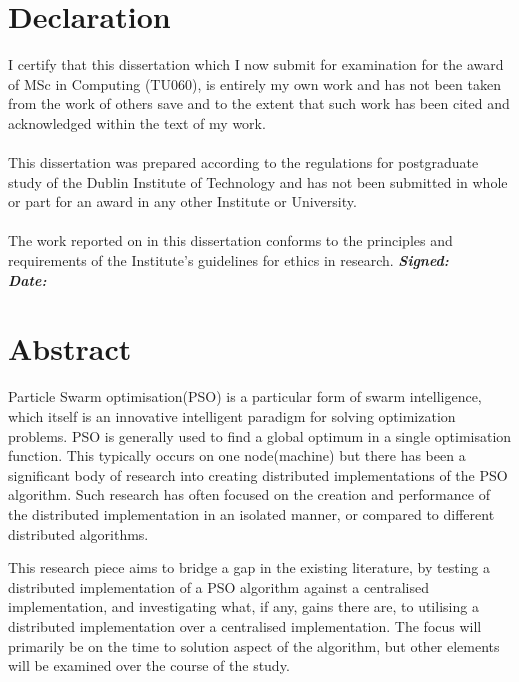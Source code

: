 \documentclass[oneside,12pt]{book}
\begin{document}
\chapter*{Declaration}
I certify that this dissertation which I now submit for examination for the award of
MSc in Computing (TU060), is entirely my own work and has not been taken
from the work of others save and to the extent that such work has been cited and
acknowledged within the text of my work.
\\
\\
This dissertation was prepared according to the regulations for postgraduate study of
the Dublin Institute of Technology and has not been submitted in whole or part for an
award in any other Institute or University.
\\
\\
The work reported on in this dissertation conforms to the principles and requirements
of the Institute’s guidelines for ethics in research.
\vfill
\noindent
\textit{\textbf{Signed:}}  \\

\noindent
\textit{\textbf{Date:}}
\vspace{0.8cm}

\chapter*{Abstract}
\par 
Particle Swarm optimisation(PSO) is a particular form of swarm intelligence, which itself is an innovative intelligent paradigm for solving optimization problems. PSO is generally used to find a global optimum in a single optimisation function. This typically occurs on one node(machine) but there has been a significant body of research into creating distributed implementations of the PSO algorithm. Such research has often focused on the creation and performance of the distributed implementation in an isolated manner, or compared to different distributed algorithms. 

This research piece aims to bridge a gap in the existing literature, by testing a distributed implementation of a PSO algorithm against a centralised implementation, and investigating what, if any, gains there are, to utilising a distributed implementation over a centralised implementation. The focus will primarily be on the time to solution aspect of the algorithm, but other elements will be examined over the course of the study.  
\end{document}
